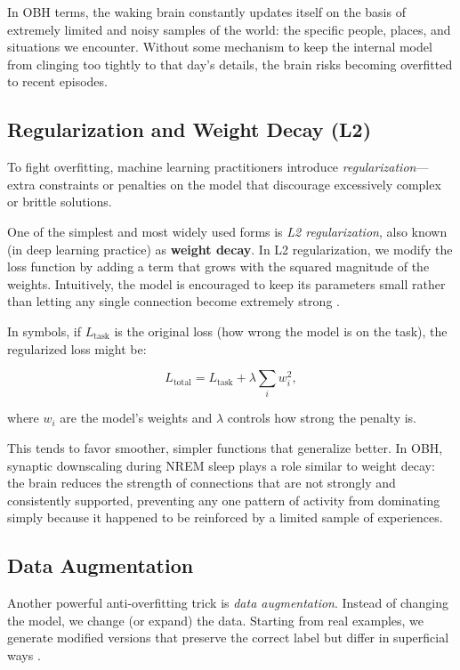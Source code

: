 In OBH terms, the waking brain constantly updates itself on the basis of extremely limited and noisy samples of the world: the specific people, places, and situations we encounter. Without some mechanism to keep the internal model from clinging too tightly to that day's details, the brain risks becoming overfitted to recent episodes.


\subsection{Regularization and Weight Decay (L2)}\label{sec:ml_regularization}

To fight overfitting, machine learning practitioners introduce \emph{regularization}---extra constraints or penalties on the model that discourage excessively complex or brittle solutions.

One of the simplest and most widely used forms is \emph{L2 regularization}, also known (in deep learning practice) as \textbf{weight decay}. In L2 regularization, we modify the loss function by adding a term that grows with the squared magnitude of the weights. Intuitively, the model is encouraged to keep its parameters small rather than letting any single connection become extremely strong \citep{benihime91_weight_decay}.

In symbols, if $L_{\text{task}}$ is the original loss (how wrong the model is on the task), the regularized loss might be:

\[
L_{\text{total}} = L_{\text{task}} + \lambda \sum_i w_i^2,
\]

where $w_i$ are the model's weights and $\lambda$ controls how strong the penalty is.

This tends to favor smoother, simpler functions that generalize better. In OBH, synaptic downscaling during NREM sleep plays a role similar to weight decay: the brain reduces the strength of connections that are not strongly and consistently supported, preventing any one pattern of activity from dominating simply because it happened to be reinforced by a limited sample of experiences.


\subsection{Data Augmentation}\label{sec:ml_data_augmentation}

Another powerful anti-overfitting trick is \emph{data augmentation}. Instead of changing the model, we change (or expand) the data. Starting from real examples, we generate modified versions that preserve the correct label but differ in superficial ways \citep{datacamp_data_augmentation}.


